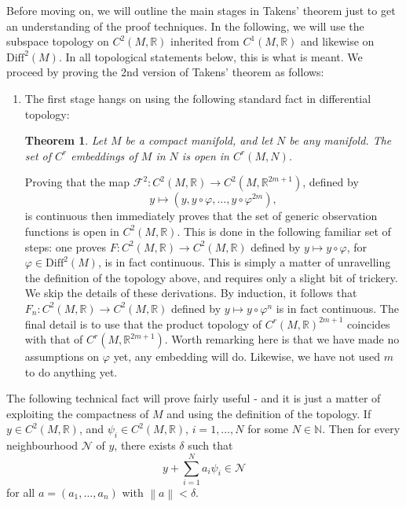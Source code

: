\documentclass[11pt, a4paper]{memoir}
\theoremstyle{plain}
\newtheorem{thm}{Theorem}
\theoremstyle{definition}
\newcommand{\mN}{\mathbb{N}}
\newcommand{\mR}{\mathbb{R}}
\newcommand{\norm}[1]{\left\lVert#1\right\rVert}
\begin{document}
Before moving on, we will outline the main stages in Takens' theorem just to get an understanding of the proof techniques. In the following, we will use the subspace topology on $C^2(M,\mR)$ inherited from $C^1(M,\mR)$ and likewise on $\text{Diff}^2(M)$. In all topological statements below, this is what is meant. We proceed by proving the 2nd version of Takens' theorem as follows:
\begin{enumerate}[label=\roman*)]
	\item The first stage hangs on using the following standard fact in differential topology:
	\begin{thm}
	Let $M$ be a compact manifold, and let $N$ be any manifold. The set of $C^r$ embeddings of $M$ in $N$ is open in $C^r(M,N)$. \cite{hirsch}
	\end{thm}
	Proving that the map $\mathcal{F}^2: C^2(M,\mR)\to C^2(M,\mR^{2m+1})$, defined by $$y\mapsto (y,y\circ\varphi,\ldots, y\circ \varphi^{2m}),$$ 
	is continuous then immediately proves that the set of generic observation functions is open in $C^2(M,\mR)$. This is done in the following familiar set of steps: one proves $F: C^2(M,\mR)\to C^2(M,\mR)$ defined by $y\mapsto y\circ\varphi$, for $\varphi\in \text{Diff}^2(M)$, is in fact continuous.  This is simply a matter of unravelling the definition of the topology above, and requires only a slight bit of trickery. We skip the details of these derivations. By induction, it follows that $F_n:  C^2(M,\mR)\to C^2(M,\mR)$ defined by $y\mapsto y\circ\varphi^n$ is in fact continuous.  The final detail is to use that the product topology of $C^r(M,\mR)^{2m+1}$ coincides with that of $C^r(M,\mR^{2m+1})$. Worth remarking here is that we have made no assumptions on $\varphi$ yet, any embedding will do. Likewise, we have not used $m$ to do anything yet. 
\end{enumerate}
The following technical fact will prove fairly useful - and it is just a matter of exploiting the compactness of $M$ and using the definition of the topology. If $y\in C^2(M,\mR)$, and $\psi_i\in C^2(M,\mR)$, $i=1,\ldots,N$ for some $N\in \mN$. Then for every neighbourhood $\mathcal{N}$ of $y$, there exists $\delta$ such that
$$y+\sum_{i=1}^N a_i\psi_i\in \mathcal{N}$$
for all $a=(a_1,\ldots,a_n)$ with $\norm{a}< \delta$. 
\end{document}
